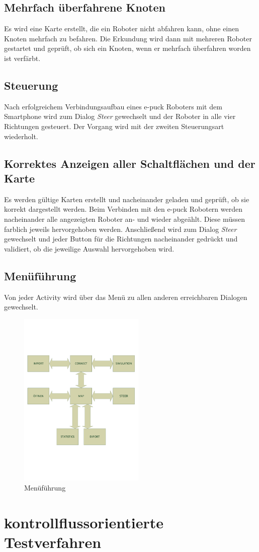\documentclass[10pt,a4paper]{article}
\begin{document}
		\subsection{Mehrfach \"uberfahrene Knoten}
			Es wird eine Karte erstellt, die ein Roboter nicht abfahren kann, ohne einen Knoten mehrfach zu befahren. Die Erkundung wird dann mit mehreren Roboter 
 			gestartet und gepr\"uft, ob sich ein Knoten, wenn er mehrfach \"uberfahren worden ist verf\"arbt.
		\subsection{Steuerung}
			Nach erfolgreichem Verbindungsaufbau eines e-puck Roboters mit dem Smartphone wird zum Dialog \textit{Steer} gewechselt und der Roboter in alle vier
			Richtungen gesteuert. Der Vorgang wird mit der zweiten Steuerungsart wiederholt.		
		\subsection{Korrektes Anzeigen aller Schaltfl\"achen und der Karte}
			Es werden g\"ultige Karten erstellt und nacheinander geladen und gepr\"uft, ob sie korrekt dargestellt werden. Beim Verbinden mit den e-puck Robotern werden 
			nacheinander alle angezeigten Roboter an- und wieder abge\"ahlt. Diese m\"ussen farblich jeweils hervorgehoben werden. Anschlie\ss end wird zum Dialog 
			\textit{Steer} gewechselt und jeder Button f\"ur die Richtungen nacheinander gedr\"uckt und validiert, ob die jeweilige Auswahl hervorgehoben wird.
		\subsection{Men\"uf\"uhrung}
			Von jeder Activity wird \"uber das Men\"u zu allen anderen erreichbaren Dialogen gewechselt.
		\begin{figure}[htbp]
		\centering
			\includegraphics[width = 6cm]{images/Zeichnung1}
			\caption{Men\"uf\"uhrung}
		\end{figure}
		
	\section{kontrollflussorientierte Testverfahren}

				 			
\end{document}
